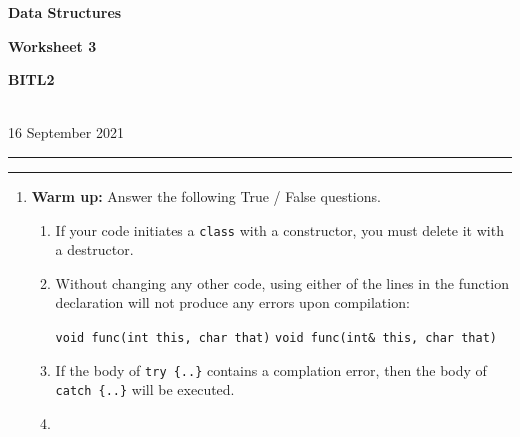 \documentclass[a4paper,12pt]{article}
\begin{document}
\begin{center}
\parbox{3.5cm}{\textbf{Data Structures}} \hfill {\bf\Huge Worksheet 3} \hfill \parbox{3.5cm}{\flushright\textbf{BITL2}} \\[5pt]
\rm\small 16 September 2021
\end{center}

\hrule\vspace{2pt}\hrule

\begin{enumerate}

\item \textbf{Warm up:} Answer the following True / False questions.
\begin{enumerate}
\item If your code initiates a \texttt{class} with a constructor, you must delete it with a destructor.
\item Without changing any other code, using either of the lines in the function declaration will not produce any errors upon compilation:
\begin{center}
\texttt{void func(int this, char that)}
\hspace{1cm}
\texttt{void func(int\& this, char that)}
\end{center}
\item If the body of \texttt{try \{..\}} contains a complation error, then the body of  \texttt{catch \{..\}} will be executed. 
\item 
\end{enumerate}

\end{enumerate}
\end{document}
